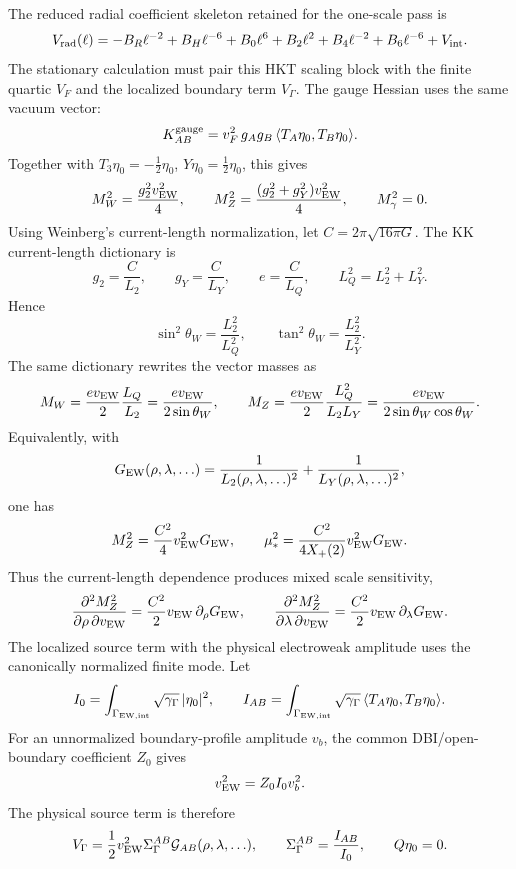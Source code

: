 \documentclass[11pt]{article}
\theoremstyle{definition}
\theoremstyle{remark}
\newcommand{\half}{\tfrac12}
\newcommand{\Xp}{X_+}
\begin{document}
The reduced radial coefficient skeleton retained for the one-scale pass is
\[
  V_{\rm rad}(\ell)
  =
  -B_R\ell^{-2}
  +B_H\ell^{-6}
  +B_0\ell^6
  +B_2\ell^2
  +B_4\ell^{-2}
  +B_6\ell^{-6}
  +V_{\rm int}.
\]
The stationary calculation must pair this HKT scaling block with the finite
quartic \(V_F\) and the localized boundary term \(V_\Gamma\).
The gauge Hessian uses the same vacuum vector:
\[
  K_{AB}^{\rm gauge}
  =
  v_F^2\,g_Ag_B\,
  \langle T_A\eta_0,T_B\eta_0\rangle.
\]
Together with \(T_3\eta_0=-\half\eta_0\), \(Y\eta_0=\half\eta_0\), this gives
\[
  M_W^2=\frac{g_2^2v_{\rm EW}^2}{4},
  \qquad
  M_Z^2=\frac{(g_2^2+g_Y^2)v_{\rm EW}^2}{4},
  \qquad
  M_\gamma^2=0.
\]
Using Weinberg's current-length normalization, let
\(C=2\pi\sqrt{16\pi G}\).  The KK current-length dictionary is
\[
  g_2=\frac{C}{L_2},\qquad
  g_Y=\frac{C}{L_Y},\qquad
  e=\frac{C}{L_Q},\qquad
  L_Q^2=L_2^2+L_Y^2 .
\]
Hence
\[
  \sin^2\theta_W=\frac{L_2^2}{L_Q^2},
  \qquad
  \tan^2\theta_W=\frac{L_2^2}{L_Y^2}.
\]
The same dictionary rewrites the vector masses as
\[
  M_W=\frac{ev_{\rm EW}}{2}\frac{L_Q}{L_2}
  =
  \frac{ev_{\rm EW}}{2\sin\theta_W},
  \qquad
  M_Z=\frac{ev_{\rm EW}}{2}\frac{L_Q^2}{L_2L_Y}
  =
  \frac{ev_{\rm EW}}{2\sin\theta_W\cos\theta_W}.
\]
Equivalently, with
\[
  G_{\rm EW}(\rho,\lambda,\ldots)
  =
  \frac{1}{L_2(\rho,\lambda,\ldots)^2}
  +
  \frac{1}{L_Y(\rho,\lambda,\ldots)^2},
\]
one has
\[
  M_Z^2=\frac{C^2}{4}v_{\rm EW}^2G_{\rm EW},
  \qquad
  \mu_*^2=
  \frac{C^2}{4\Xp(2)}v_{\rm EW}^2G_{\rm EW}.
\]
Thus the current-length dependence produces mixed scale sensitivity,
\[
  \frac{\partial^2M_Z^2}{\partial\rho\,\partial v_{\rm EW}}
  =
  \frac{C^2}{2}v_{\rm EW}\,\partial_\rho G_{\rm EW},
  \qquad
  \frac{\partial^2M_Z^2}{\partial\lambda\,\partial v_{\rm EW}}
  =
  \frac{C^2}{2}v_{\rm EW}\,\partial_\lambda G_{\rm EW}.
\]
The localized source term with the physical electroweak amplitude uses the
canonically normalized finite mode.  Let
\[
  I_0=
  \int_{\Gamma_{\rm EW,int}}\sqrt{\gamma_\Gamma}\,|\eta_0|^2,
  \qquad
  I_{AB}=
  \int_{\Gamma_{\rm EW,int}}\sqrt{\gamma_\Gamma}\,
  \langle T_A\eta_0,T_B\eta_0\rangle .
\]
For an unnormalized boundary-profile amplitude \(v_b\), the common
DBI/open-boundary coefficient \(Z_0\) gives
\[
  v_{\rm EW}^2=Z_0I_0v_b^2.
\]
The physical source term is therefore
\[
  V_{\Gamma}
  =
  \frac12v_{\rm EW}^2
  \Sigma_\Gamma^{AB}{\cal G}_{AB}(\rho,\lambda,\ldots),
  \qquad
  \Sigma_\Gamma^{AB}=\frac{I_{AB}}{I_0},
  \qquad Q\eta_0=0.
\]
\end{document}
